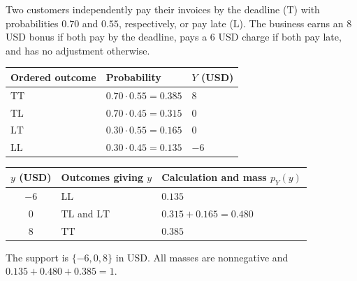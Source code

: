
Two customers independently pay their invoices by the deadline (\(\mathrm{T}\)) with probabilities \(0.70\) and \(0.55\), respectively, or pay late (\(\mathrm{L}\)). The business earns an \(8\) USD bonus if both pay by the deadline, pays a \(6\) USD charge if both pay late, and has no adjustment otherwise.

\noindent
\begin{minipage}[t]{0.48\linewidth}
	
	\begin{tabularx}{\linewidth}{|l|Y|Y|}
		\hline
		Ordered outcome & Probability & \(Y\) (USD) \\ \hline
		\(\mathrm{TT}\) & \(0.70\cdot0.55\)\newline \(=0.385\) & \(8\) \\ \hline
		\(\mathrm{TL}\) & \(0.70\cdot0.45\)\newline \(=0.315\) & \(0\) \\ \hline
		\(\mathrm{LT}\) & \(0.30\cdot0.55\)\newline \(=0.165\) & \(0\) \\ \hline
		\(\mathrm{LL}\) & \(0.30\cdot0.45\)\newline \(=0.135\) & \(-6\) \\ \hline
	\end{tabularx}
\end{minipage}
\hfill
\begin{minipage}[t]{0.48\linewidth}
	
	\begin{tabularx}{\linewidth}{|c|Y|Y|}
		\hline
		\(y\) (USD) & Outcomes giving \(y\) & Calculation and mass \(p_Y(y)\) \\ \hline
		\(-6\) & \(\mathrm{LL}\) & \(0.135\) \\ \hline
		\(0\) & \(\mathrm{TL}\) and \(\mathrm{LT}\) & \(0.315+0.165\)\newline \(=0.480\) \\ \hline
		\(8\) & \(\mathrm{TT}\) & \(0.385\) \\ \hline
	\end{tabularx}
	
	\medskip
	The support is \(\{-6,0,8\}\) in USD.
	All masses are nonnegative and
	\(0.135+0.480+0.385=1\).
\end{minipage}

